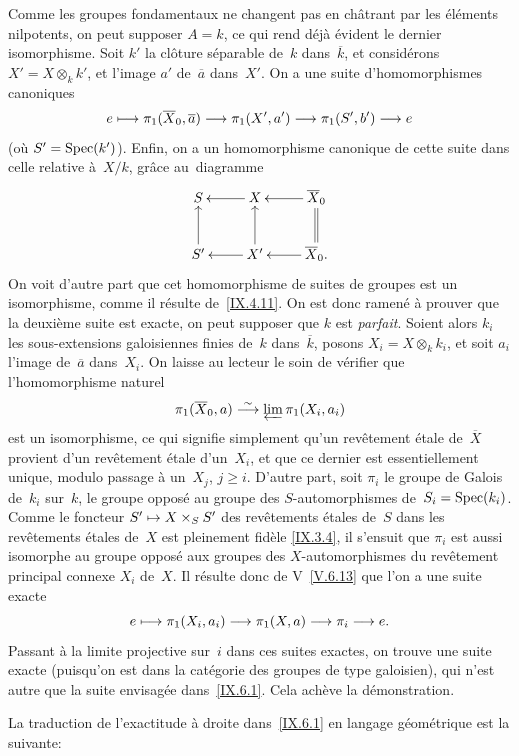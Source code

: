 Comme les groupes fondamentaux ne changent pas en ch\^atrant par les
\'el\'ements nilpotents, on peut supposer $A=k$, ce qui rend
d\'ej\`a \'evident le dernier isomorphisme. Soit $k'$ la
cl\^oture s\'eparable de~$k$ dans~$\overline{k}$, et
consid\'erons $X'=X\otimes_k k'$, et l'image $a'$ de~$\overline{a}$
dans~$X'$. On a une suite d'homomorphismes canoniques
$$
e\mto \pi_1(\overline{X}_0,\overline{a})\to
\pi_1(X',a')\to\pi_1(S',b')\to e
$$
(o\`u $S'=\operatorname{Spec}(k')$). Enfin, on a un homomorphisme canonique de
cette suite dans celle relative \`a~$X/k$, gr\^ace au~diagramme
$$
\xymatrix{{S}&{X}\ar[l]&{\overline{X}_0}\ar[l]\\{S'}\ar[u]&{X'}\ar[u]\ar[l]&{\overline{X}_0  .}\ar[l]\ar@{=}[u]}
$$
On voit d'autre part que cet homomorphisme de suites de groupes est un
isomorphisme, comme il r\'esulte de~\ref{IX.4.11}. On est donc
ramen\'e \`a prouver que la deuxi\`eme suite est exacte, \ie on
peut supposer que $k$ est \emph{parfait}. Soient alors $k_i$ les
sous-extensions galoisiennes finies de~$k$ dans~$\overline{k}$, posons
$X_i=X\otimes_k k_i$, et soit $a_i$ l'image de~$\overline{a}$
dans~$X_i$. On laisse au lecteur
le soin
de v\'erifier que l'homomorphisme
naturel
$$
\pi_1(\overline{X}_0,a)\overset{\sim}{\longrightarrow} \varprojlim\pi_1(X_i,a_i)
$$
est un isomorphisme, ce qui signifie simplement qu'un rev\^etement
\'etale de~$\overline{X}$ provient d'un rev\^etement \'etale
d'un~$X_i$, et que ce dernier est essentiellement unique, modulo
passage \`a un~$X_j$, $j\geq i$. D'autre part, soit $\pi_i$ le
groupe de Galois de~$k_i$ sur~$k$, \ie le groupe oppos\'e au groupe
des $S$-automorphismes de~$S_i=\operatorname{Spec}(k_i)$. Comme le foncteur
$S'\mto X\times_S S'$ des rev\^etements \'etales de~$S$ dans
les rev\^etements \'etales de~$X$ est pleinement fid\`ele
\eqref{IX.3.4}, il s'ensuit que $\pi_i$ est aussi isomorphe au groupe
oppos\'e aux groupes des $X$-automorphismes du rev\^etement
principal connexe $X_i$ de~$X$. Il r\'esulte donc de
V~\ref{V.6.13} que l'on a une suite exacte
$$
e\mto \pi_1(X_i,a_i)\to \pi_1(X,a)\to\pi_i\to e.
$$
Passant \`a la limite projective sur~$i$ dans ces suites exactes, on
trouve une suite exacte (puisqu'on est dans la cat\'egorie des
groupes de type galoisien), qui n'est autre que la suite envisag\'ee
dans~\ref{IX.6.1}. Cela ach\`eve la d\'emonstration.

La traduction de l'exactitude \`a droite dans~\ref{IX.6.1} en
langage g\'eom\'etrique est la suivante:

